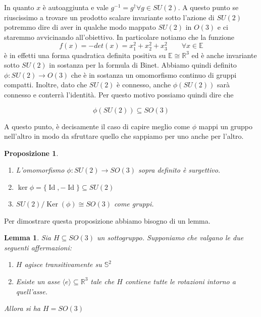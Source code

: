 \documentclass[11pt]{article}
\theoremstyle{plain}
\newtheorem{lemma}[thm]{Lemma}
\newtheorem{prop}[thm]{Proposizione}
\theoremstyle{definition}
\theoremstyle{remark}
\newcommand{\R}{\mathbb{R}}
\DeclareMathOperator{\Ker}{Ker}
\DeclareMathOperator{\Id}{Id}
\begin{document}
 In quanto $x$ è autoaggiunta e vale $g^{-1} = g^\dag \forall g \in SU(2)$. A questo punto se riuscissimo a trovare un prodotto scalare invariante sotto l'azione di $SU(2)$ potremmo dire di aver in qualche modo mappato $SU(2)$ in $O(3)$ e ci staremmo avvicinando all'obiettivo. In particolare notiamo che la funzione
 \[ f(x) = -det (x) = x_1 ^2 + x_2^2 + x_3^2 \qquad \forall x \in \mathbb{E}\]
 è in effetti una forma quadratica definita positiva su $\mathbb{E} \cong \R^3$ ed è anche invariante sotto $SU(2)$ in sostanza per la formula di Binet. Abbiamo quindi definito $\phi: SU(2) \to O(3)$ che è in sostanza un omomorfismo continuo di gruppi compatti. Inoltre, dato che $SU(2)$ è connesso, anche $\phi(SU(2))$ sarà connesso e conterrà l'identità. Per questo motivo possiamo quindi dire che

 \[ \phi(SU(2)) \subseteq SO(3) \]

 A questo punto, è decisamente il caso di capire meglio come $\phi$ mappi un gruppo nell'altro in modo da sfruttare quello che sappiamo per uno anche per l'altro.



 \begin{prop}
   \label{prop:omo su2 so3}
  \begin{enumerate}
    \item L'omomorfismo $\phi : SU(2) \to SO(3)$ sopra definito è surgettivo.
    \item $\ker \phi = \{\Id, -\Id\}\subseteq SU(2)$
    \item $SU(2) / \Ker(\phi) \cong SO(3)$ come gruppi.
  \end{enumerate}
  \end{prop}

Per dimostrare questa proposizione abbiamo bisogno di un lemma.


\begin{lemma}
  Sia $H \subseteq SO(3)$ un sottogruppo. Supponiamo che valgano le due seguenti affermazioni:

  \begin{enumerate}
  \item $H$ agisce transitivamente su $\mathbb{S}^2$
    \item Esiste un asse $\langle e \rangle \subseteq \R^3$ tale che $H$ contiene tutte le rotazioni intorno a quell'asse.
  \end{enumerate}

  Allora si ha $H = SO(3)$
\end{lemma}
\end{document}
